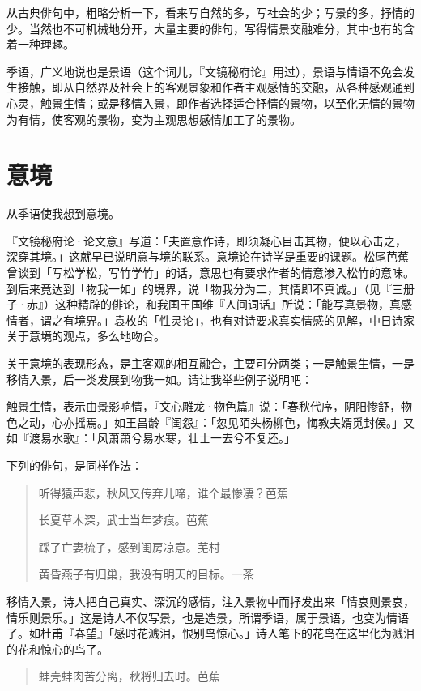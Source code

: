 {    从古典俳句中，粗略分析一下，看来写自然的多，写社会的少；写景的多，抒情的少。当然也不可机械地分开，大量主要的俳句，写得情景交融难分，其中也有的含着一种理趣。

    季语，广义地说也是景语（这个词儿，『文镜秘府论』用过），景语与情语不免会发生接触，即从自然界及社会上的客观景象和作者主观感情的交融，从各种感观通到心灵，触景生情；或是移情入景，即作者选择适合抒情的景物，以至化无情的景物为有情，使客观的景物，变为主观思想感情加工了的景物。

    \section*{\FS 意境}

    从季语使我想到意境。

    『文镜秘府论·论文意』写道：「夫置意作诗，即须凝心目击其物，便以心击之，深穿其境。」这就早已说明意与境的联系。意境论在诗学是重要的课题。松尾芭蕉曾谈到「写松学松，写竹学竹」的话，意思也有要求作者的情意渗入松竹的意味。到后来竟达到「物我一如」的境界，说「物我分为二，其情即不真诚。」（见『三册子·赤』）这种精辟的俳论，和我国王国维『人间词话』所说：「能写真景物，真感情者，谓之有境界。」袁枚的「性灵论」，也有对诗要求真实情感的见解，中日诗家关于意境的观点，多么地吻合。

    关于意境的表现形态，是主客观的相互融合，主要可分两类；一是触景生情，一是移情入景，后一类发展到物我一如。请让我举些例子说明吧：

    触景生情，表示由景影响情，『文心雕龙·物色篇』说：「春秋代序，阴阳惨舒，物色之动，心亦摇焉。」如王昌龄『闺怨』：「忽见陌头杨柳色，悔教夫婿觅封侯。」又如『渡易水歌』：「风萧萧兮易水寒，壮士一去兮不复还。」

    下列的俳句，是同样作法：

    \begin{quote}
        听得猿声悲，秋风又传弃儿啼，谁个最惨凄？\hfill 芭蕉

        长夏草木深，武士当年梦痕。\hfill 芭蕉

        踩了亡妻梳子，感到闺房凉意。\hfill 芜村

        黄昏燕子有归巢，我没有明天的目标。\hfill 一茶
    \end{quote}

    移情入景，诗人把自己真实、深沉的感情，注入景物中而抒发出来「情哀则景哀，情乐则景乐。」这是诗人不仅写景，也是造景，所谓季语，属于景语，也变为情语了。如杜甫『春望』「感时花溅泪，恨别鸟惊心。」诗人笔下的花鸟在这里化为溅泪的花和惊心的鸟了。

    \begin{quote}
        蚌壳蚌肉苦分离，秋将归去时。\hfill 芭蕉
    \end{quote}

}
